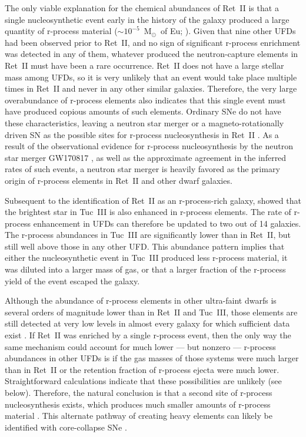 \documentclass[a4paper]{ar-1col}
\newcommand{\msun}        {M$_{\odot}$}
\begin{document}
The only viable explanation for the chemical abundances of Ret~II is
that a single nucleosynthetic event early in the history of the galaxy
produced a large quantity of r-process material
($\sim10^{-5}$~\msun\ of Eu; \citealt{ji16}).  Given that nine other
UFDs had been observed prior to Ret~II, and no sign of significant
r-process enrichment was detected in any of them, whatever produced
the neutron-capture elements in Ret~II must have been a rare
occurrence.  Ret~II does not have a large stellar mass among UFDs, so
it is very unlikely that an event would take place multiple times in
Ret~II and never in any other similar galaxies.  Therefore, the very
large overabundance of r-process elements also indicates that this
single event must have produced copious amounts of such elements.
Ordinary SNe do not have these characteristics, leaving a neutron star
merger or a magneto-rotationally driven SN as the possible sites for
r-process nucleosynthesis in Ret~II \citep{ji16,roederer16}.  As a
result of the observational evidence for r-process nucleosynthesis by
the neutron star merger GW170817
\citep[e.g.,][]{chornock17,cowperthwaite17,drout17,kasliwal17,pian17,shappee17,smartt17},
as well as the approximate agreement in the inferred rates of such
events, a neutron star merger is heavily favored as the primary origin
of r-process elements in Ret~II and other dwarf galaxies.

Subsequent to the identification of Ret~II as an r-process-rich
galaxy, \citet{hansen17} showed that the brightest star in Tuc~III is
also enhanced in r-process elements.  The rate of r-process
enhancement in UFDs can therefore be updated to two out of 14
galaxies.  The r-process abundances in Tuc~III are significantly lower
than in Ret~II, but still well above those in any other UFD.  This
abundance pattern implies that either the nucleosynthetic event in
Tuc~III produced less r-process material, it was diluted into a larger
mass of gas, or that a larger fraction of the r-process yield of the
event escaped the galaxy.

Although the abundance of r-process elements in other ultra-faint
dwarfs is several orders of magnitude lower than in Ret~II and
Tuc~III, those elements are still detected at very low levels in
almost every galaxy for which sufficient data exist
\citep[e.g.,][]{frebel10,roederer13,gilmore13,fsk14,ishigaki14,chiti18}.
If Ret~II was enriched by a single r-process event, then the only way
the same mechanism could account for much lower --- but nonzero ---
r-process abundances in other UFDs is if the gas masses of those
systems were much larger than in Ret~II or the retention fraction of
r-process ejecta were much lower.  Straightforward calculations
indicate that these possibilities are unlikely (see below).
Therefore, the natural conclusion is that a second site of r-process
nucleosynthesis exists, which produces much smaller amounts of
r-process material \citep{ji16c}.  This alternate pathway of creating
heavy elements can likely be identified with core-collapse SNe
\citep[e.g.,][]{lee13}.
\end{document}
